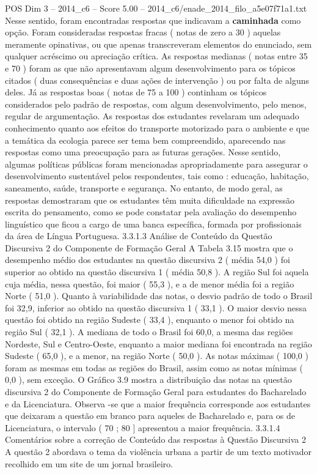 \begin{textsample}{POS Dim 3 – 2014\_c6 – Score 5.00 – 2014\_c6/enade\_2014\_filo\_a5e07f71a1.txt}
Nesse sentido, foram encontradas respostas que indicavam a \textbf{caminhada} como opção.
Foram consideradas respostas fracas ( notas de zero a 30 ) aquelas meramente opinativas, ou que apenas transcreveram elementos do enunciado, sem qualquer acréscimo ou apreciação crítica.
As respostas medianas ( notas entre 35 e 70 ) foram as que não apresentavam algum desenvolvimento para os tópicos citados ( duas consequências e duas ações de intervenção ) ou por falta de alguns deles.
Já as respostas boas ( notas de 75 a 100 ) continham os tópicos considerados pelo padrão de respostas, com algum desenvolvimento, pelo menos, regular de argumentação.
As respostas dos estudantes revelaram um adequado conhecimento quanto aos efeitos do transporte motorizado para o ambiente e que a temática da ecologia parece ser tema bem compreendido, aparecendo nas respostas como uma preocupação para as futuras gerações.
Nesse sentido, algumas políticas públicas foram mencionadas apropriadamente para assegurar o desenvolvimento sustentável pelos respondentes, tais como : educação, habitação, saneamento, saúde, transporte e segurança.
No entanto, de modo geral, as respostas demostraram que os estudantes têm muita dificuldade na expressão escrita do pensamento, como se pode constatar pela avaliação do desempenho linguístico que ficou a cargo de uma banca específica, formada por profissionais da área de Língua Portuguesa. 3.3.1.3 Análise de Conteúdo da Questão Discursiva 2 do Componente de Formação Geral A Tabela 3.15 mostra que o desempenho médio dos estudantes na questão discursiva 2 ( média 54,0 ) foi superior ao obtido na questão discursiva 1 ( média 50,8 ).
A região Sul foi aquela cuja média, nessa questão, foi maior ( 55,3 ), e a de menor média foi a região Norte ( 51,0 ).
Quanto à variabilidade das notas, o desvio padrão de todo o Brasil foi 32,9, inferior ao obtido na questão discursiva 1 ( 33,1 ).
O maior desvio nessa questão foi obtido na região Sudeste ( 33,4 ), enquanto o menor foi obtido na região Sul ( 32,1 ).
A mediana de todo o Brasil foi 60,0, a mesma das regiões Nordeste, Sul e Centro-Oeste, enquanto a maior mediana foi encontrada na região Sudeste ( 65,0 ), e a menor, na região Norte ( 50,0 ).
As notas máximas ( 100,0 ) foram as mesmas em todas as regiões do Brasil, assim como as notas mínimas ( 0,0 ), sem exceção.
O Gráfico 3.9 mostra a distribuição das notas na questão discursiva 2 do Componente de Formação Geral para estudantes do Bacharelado e da Licenciatura.
Observa -se que a maior frequência corresponde aos estudantes que deixaram a questão em branco para aqueles de Bacharelado e, para os de Licenciatura, o intervalo ( 70 ; 80 ] apresentou a maior frequência. 3.3.1.4 Comentários sobre a correção de Conteúdo das respostas à Questão Discursiva 2 A questão 2 abordava o tema da violência urbana a partir de um texto motivador recolhido em um site de um jornal brasileiro.

\end{textsample}
